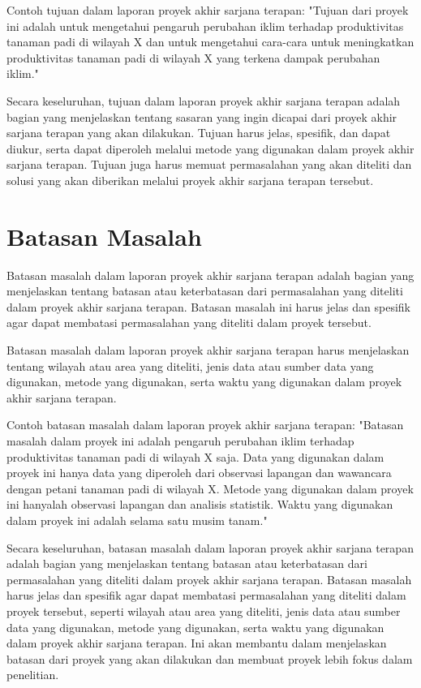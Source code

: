 Contoh tujuan dalam laporan proyek akhir sarjana terapan:
"Tujuan dari proyek ini adalah untuk mengetahui pengaruh perubahan iklim terhadap produktivitas tanaman padi di wilayah X dan untuk mengetahui cara-cara untuk meningkatkan produktivitas tanaman padi di wilayah X yang terkena dampak perubahan iklim."

Secara keseluruhan, tujuan dalam laporan proyek akhir sarjana terapan adalah bagian yang menjelaskan tentang sasaran yang ingin dicapai dari proyek akhir sarjana terapan yang akan dilakukan. Tujuan harus jelas, spesifik, dan dapat diukur, serta dapat diperoleh melalui metode yang digunakan dalam proyek akhir sarjana terapan. Tujuan juga harus memuat permasalahan yang akan diteliti dan solusi yang akan diberikan melalui proyek akhir sarjana terapan tersebut.


\section{Batasan Masalah}
Batasan masalah dalam laporan proyek akhir sarjana terapan adalah bagian yang menjelaskan tentang batasan atau keterbatasan dari permasalahan yang diteliti dalam proyek akhir sarjana terapan. Batasan masalah ini harus jelas dan spesifik agar dapat membatasi permasalahan yang diteliti dalam proyek tersebut.

Batasan masalah dalam laporan proyek akhir sarjana terapan harus menjelaskan tentang wilayah atau area yang diteliti, jenis data atau sumber data yang digunakan, metode yang digunakan, serta waktu yang digunakan dalam proyek akhir sarjana terapan.

Contoh batasan masalah dalam laporan proyek akhir sarjana terapan:
"Batasan masalah dalam proyek ini adalah pengaruh perubahan iklim terhadap produktivitas tanaman padi di wilayah X saja. Data yang digunakan dalam proyek ini hanya data yang diperoleh dari observasi lapangan dan wawancara dengan petani tanaman padi di wilayah X. Metode yang digunakan dalam proyek ini hanyalah observasi lapangan dan analisis statistik. Waktu yang digunakan dalam proyek ini adalah selama satu musim tanam."

Secara keseluruhan, batasan masalah dalam laporan proyek akhir sarjana terapan adalah bagian yang menjelaskan tentang batasan atau keterbatasan dari permasalahan yang diteliti dalam proyek akhir sarjana terapan. Batasan masalah harus jelas dan spesifik agar dapat membatasi permasalahan yang diteliti dalam proyek tersebut, seperti wilayah atau area yang diteliti, jenis data atau sumber data yang digunakan, metode yang digunakan, serta waktu yang digunakan dalam proyek akhir sarjana terapan. Ini akan membantu dalam menjelaskan batasan dari proyek yang akan dilakukan dan membuat proyek lebih fokus dalam penelitian.


